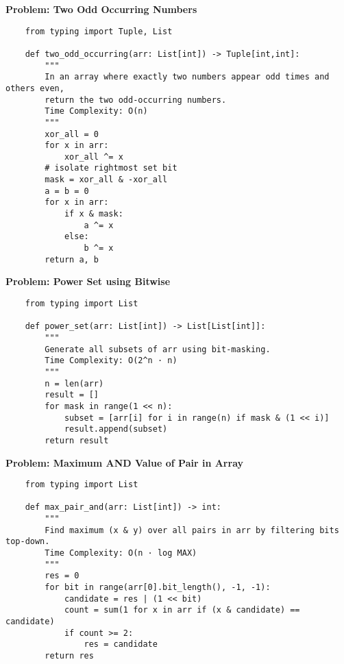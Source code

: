     \noindent\textbf{Problem: Two Odd Occurring Numbers}
    \begin{verbatim}
    from typing import Tuple, List

    def two_odd_occurring(arr: List[int]) -> Tuple[int,int]:
        """
        In an array where exactly two numbers appear odd times and others even,
        return the two odd-occurring numbers.
        Time Complexity: O(n)
        """
        xor_all = 0
        for x in arr:
            xor_all ^= x
        # isolate rightmost set bit
        mask = xor_all & -xor_all
        a = b = 0
        for x in arr:
            if x & mask:
                a ^= x
            else:
                b ^= x
        return a, b
    \end{verbatim}

    \noindent\textbf{Problem: Power Set using Bitwise}
    \begin{verbatim}
    from typing import List

    def power_set(arr: List[int]) -> List[List[int]]:
        """
        Generate all subsets of arr using bit-masking.
        Time Complexity: O(2^n · n)
        """
        n = len(arr)
        result = []
        for mask in range(1 << n):
            subset = [arr[i] for i in range(n) if mask & (1 << i)]
            result.append(subset)
        return result
    \end{verbatim}

    \noindent\textbf{Problem: Maximum AND Value of Pair in Array}
    \begin{verbatim}
    from typing import List

    def max_pair_and(arr: List[int]) -> int:
        """
        Find maximum (x & y) over all pairs in arr by filtering bits top-down.
        Time Complexity: O(n · log MAX)
        """
        res = 0
        for bit in range(arr[0].bit_length(), -1, -1):
            candidate = res | (1 << bit)
            count = sum(1 for x in arr if (x & candidate) == candidate)
            if count >= 2:
                res = candidate
        return res
    \end{verbatim}

